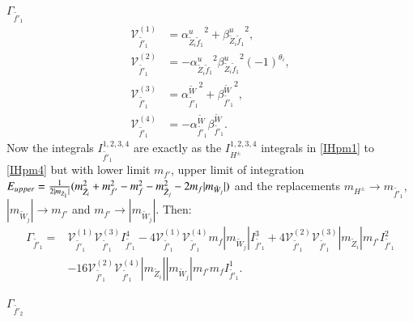 \documentclass[final,3p,times,pdflatex]{elsarticle}
\begin{document}
\textbf{\underline{$\Gamma_{\tilde{f'}_1}$}}
\begin{align}
\mathcal{V}_{\tilde{f'}_1}^{(1)} &= {\alpha_{\tilde{Z}_i \tilde{f}_1}^{u}}^2 + {\beta_{\tilde{Z}_i \tilde{f}_1}^{u}}^2, \\
\mathcal{V}_{\tilde{f'}_1}^{(2)} &= -{\alpha_{\tilde{Z}_i \tilde{f}_1}^{u}}^2 {\beta_{\tilde{Z}_i \tilde{f}_1}^{u}}^2 (-1)^{\theta_i}, \\
\mathcal{V}_{\tilde{f'}_1}^{(3)} &= {\alpha_{\tilde{f'}_1}^{\tilde{W}}}^2 + {\beta_{\tilde{f'}_1}^{\tilde{W}}}^2, \\
\mathcal{V}_{\tilde{f'}_1}^{(4)} &= -\alpha_{\tilde{f'}_1}^{\tilde{W}} \beta_{\tilde{f'}_1}^{\tilde{W}}.
\end{align}
Now the integrals $I_{\tilde{f'}_1}^{1,2,3,4}$ are exactly as the $I_{H^{\pm}}^{1,2,3,4}$ integrals in \eqref{IHpm1} to \eqref{IHpm4} but with lower limit $m_{f'}$, upper limit of integration $E_{upper} = {1 \over 2|m_{\tilde{Z}_1}|}(m_{\tilde{Z}_i}^2 + m_{f'}^2 - m_{f}^2 - m_{\tilde{Z}_j}^2 -2 m_{f}|m_{\tilde{W}_j}|)$ and the replacements $m_{H^{\pm}} \rightarrow m_{\tilde{f'}_1}$, $|m_{\tilde{W}_j}| \rightarrow m_{f'}$ and $m_{f'} \rightarrow |m_{\tilde{W}_j}|$.
Then:
\begin{equation}
\begin{aligned}
\Gamma_{\tilde{f'}_1} = & \mathcal{V}_{\tilde{f'}_1}^{(1)} \mathcal{V}_{\tilde{f'}_1}^{(3)} I_{\tilde{f'}_1}^{4} - 4 \mathcal{V}_{\tilde{f'}_1}^{(1)} \mathcal{V}_{\tilde{f'}_1}^{(4)} m_{f}|m_{\tilde{W}_j}| I_{\tilde{f'}_1}^{3} + 4 \mathcal{V}_{\tilde{f'}_1}^{(2)} \mathcal{V}_{\tilde{f'}_1}^{(3)} |m_{\tilde{Z}_i}|m_{f'} I_{\tilde{f'}_1}^{2} \\ & - 16 \mathcal{V}_{\tilde{f'}_1}^{(2)} \mathcal{V}_{\tilde{f'}_1}^{(4)} |m_{\tilde{Z}_i}||m_{\tilde{W}_j}|m_{f'}m_{f} I_{\tilde{f'}_1}^{1}.
\end{aligned}
\end{equation}

\textbf{\underline{$\Gamma_{\tilde{f'}_2}$}}
\end{document}
